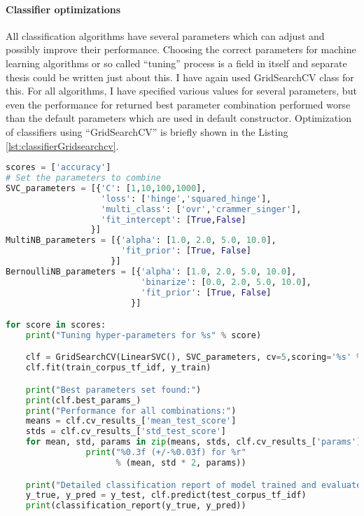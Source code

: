 \paragraph{Classifier optimizations}
All classification algorithms have several parameters which can adjust and possibly improve their performance. Choosing the correct parameters for machine learning algorithms or so called “tuning” process is a field in itself and separate thesis could be written just about this. I have again used GridSearchCV class for this. For all algorithms, I have specified various values for several parameters, but even the performance for returned best parameter combination performed worse than the default parameters which are used in default constructor. Optimization of classifiers using “GridSearchCV” is briefly shown in the Listing \ref{lst:classifierGridsearchcv}.
\\
\begin{lstlisting}[caption={Tuning of classifiers using “GridSearchCV” class },label={lst:classifierGridsearchcv},language=Python]
scores = ['accuracy']
# Set the parameters to combine
SVC_parameters = [{'C': [1,10,100,1000],
                   'loss': ['hinge','squared_hinge'],
                   'multi_class': ['ovr','crammer_singer'],
                   'fit_intercept': [True,False]
                 }]
MultiNB_parameters = [{'alpha': [1.0, 2.0, 5.0, 10.0],
                       'fit_prior': [True, False]
                     }]
BernoulliNB_parameters = [{'alpha': [1.0, 2.0, 5.0, 10.0],
                           'binarize': [0.0, 2.0, 5.0, 10.0],
                           'fit_prior': [True, False]
                         }]

for score in scores:
    print("Tuning hyper-parameters for %s" % score)

    clf = GridSearchCV(LinearSVC(), SVC_parameters, cv=5,scoring='%s' % score)
    clf.fit(train_corpus_tf_idf, y_train)

    print("Best parameters set found:")
    print(clf.best_params_)
    print("Performance for all combinations:")
    means = clf.cv_results_['mean_test_score']
    stds = clf.cv_results_['std_test_score']
    for mean, std, params in zip(means, stds, clf.cv_results_['params']):
                print("%0.3f (+/-%0.03f) for %r"
                      % (mean, std * 2, params))

    print("Detailed classification report of model trained and evaluated on full dev/eval sets:")
    y_true, y_pred = y_test, clf.predict(test_corpus_tf_idf)
    print(classification_report(y_true, y_pred))
\end{lstlisting}    


